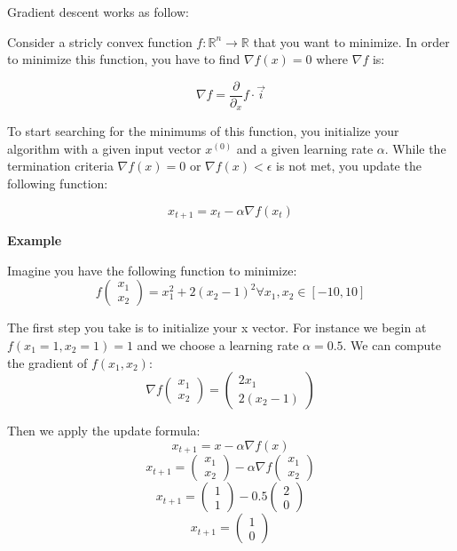 		Gradient descent works as follow:

		Consider a stricly convex function $f: \mathbb{R}^n \rightarrow \mathbb{R}$ that you want to minimize. In order to minimize this function, you have to find $\nabla f(x) = 0$ where $\nabla f$ is: 

		$$\nabla f = \frac{\partial}{\partial_{x}}f \cdot \vec{i} $$

		To start searching for the minimums of this function, you initialize your algorithm with a given input vector $x^{(0)}$ and a given learning rate $\alpha$. While the termination criteria $\nabla f(x)=0 $ or $\nabla f(x)<\epsilon $ is not met, you update the following function:
		
		$$x_{t+1} = x_t - \alpha \nabla f(x_t)$$


		\vspace{\baselineskip}
		\textbf{Example}

		Imagine you have the following function to minimize:
		$$ f\begin{pmatrix} x_1 \\ x_2 \end{pmatrix} = x_1^2 + 2(x_2-1)^2 \forall x_1, x_2 \in [-10,10]$$
		
		The first step you take is to initialize your x vector. For instance we begin at $f(x_1=1,x_2=1) = 1$ and we choose a learning rate $\alpha = 0.5$. We can compute the gradient of $f(x_1,x_2)$:
		$$ \nabla f \begin{pmatrix} x_1 \\ x_2 \end{pmatrix} = \begin{pmatrix} 2 x_1 \\ 2(x_2-1) \end{pmatrix} $$
		
		Then we apply the update formula:
		$$ x_{t+1} = x - \alpha \nabla f(x) $$
		$$ x_{t+1} = \begin{pmatrix} x_1 \\ x_2 \end{pmatrix} - \alpha \nabla f\begin{pmatrix} x_1 \\ x_2 \end{pmatrix} $$
		$$ x_{t+1} = \begin{pmatrix} 1 \\ 1 \end{pmatrix} - 0.5 \begin{pmatrix} 2 \\ 0 \end{pmatrix} $$
		$$ x_{t+1} = \begin{pmatrix} 1 \\ 0 \end{pmatrix} $$

